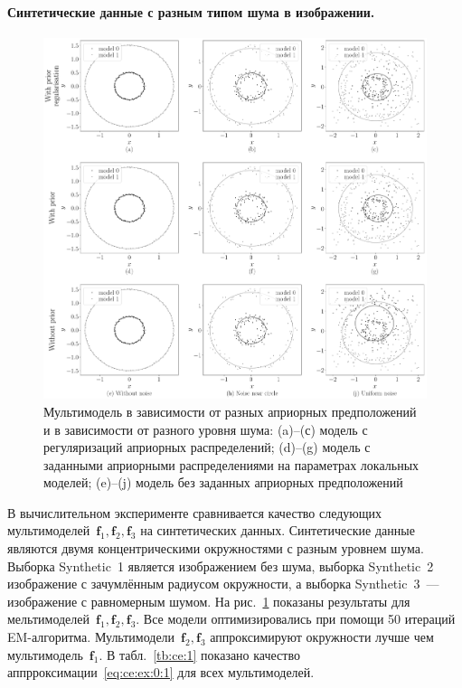 \documentclass[12pt, twoside]{article}
\numberwithin{equation}{section}
\begin{document}
\paragraph{Синтетические данные с разным типом шума в изображении.}
\begin{figure}[h!t]\center
\includegraphics[width=1\textwidth]{result_eng/experiment_synthetic}
\caption{Мультимодель в зависимости от разных априорных предположений и в зависимости от разного уровня шума: (a)--(с) модель с регуляризаций априорных распределений; (d)--(g) модель с заданными априорными распределениями на параметрах локальных моделей; (e)--(j) модель без заданных априорных предположений}
\label{experiment:1}
\end{figure}
В вычислительном эксперименте сравнивается качество следующих мультимоделей~$\textbf{f}_1, \textbf{f}_2, \textbf{f}_3$ на синтетических данных.
Синтетические данные являются двумя концентрическими окружностями с разным уровнем шума.
Выборка Synthetic~1 является изображением без шума, выборка Synthetic~2 изображение с зачумлённым радиусом окружности, а выборка Synthetic~3~--- изображение с равномерным шумом.
На рис.~\ref{experiment:1} показаны результаты для мельтимоделей~$\textbf{f}_1, \textbf{f}_2, \textbf{f}_3$.
Все модели оптимизировались при помощи 50 итераций EM-алгоритма.
Мультимодели~$\textbf{f}_2, \textbf{f}_3$ аппроксимируют окружности лучше чем мультимодель~$\textbf{f}_1$. В табл.~\ref{tb:ce:1} показано качество аппрроксимации~\eqref{eq:ce:ex:0:1} для всех мультимоделей.
\end{document}
